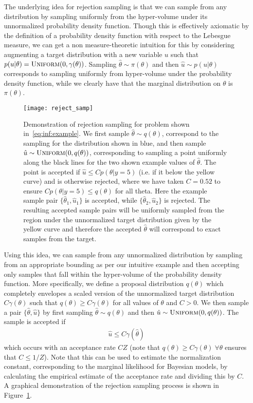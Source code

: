The underlying idea for rejection sampling is that we can sample from any distribution
by sampling uniformly from the hyper-volume under its unnormalized probability density function.
Though this is effectively axiomatic by the definition of a probability density
function with respect to the Lebesgue measure, we can get a non measure-theoretic
intuition for this by considering augmenting a target distribution with a new variable $u$
such that $p(u|\theta) = \textsc{Uniform}(0,\gamma(\theta))$.  Sampling 
$\hat{\theta} \sim \pi(\theta)$ and then $\hat{u}\sim p(u|\theta)$ corresponds to
sampling uniformly from hyper-volume under the probability density function, while we
clearly have that the marginal distribution on $\theta$ is $\pi(\theta)$.

\begin{figure}[t]
	\centering
	\texttt{[image: reject\_samp]}
	\caption{Demonstration of rejection sampling for problem shown in~\eqref{eq:inf:example}.  
		We first sample $\hat{\theta}\sim q(\theta)$, correspond to the sampling for the distribution
		shown in blue,
		and then sample $\hat{u}\sim \textsc{Uniform}(0,q(\theta))$, corresponding to
		sampling a point uniformly along the black lines for the two shown example values of 
		$\hat{\theta}$.  The point is accepted 
		if $\hat{u} \le C p(\theta | y=5)$ (i.e. if it below the yellow curve) and is 
		otherwise rejected, where we have taken
		$C=0.52$ to ensure $C p(\theta | y=5)\le q(\theta)$ for all theta.
		Here the example sample pair $\{\hat{\theta}_1,\hat{u}_1\}$ is accepted, while
		$\{\hat{\theta}_2,\hat{u}_2\}$ is rejected.  The
		resulting accepted sample pairs will be uniformly sampled from the region under
		the unnormalized target distribution given by the yellow curve and therefore
		the accepted $\hat{\theta}$ will correspond to exact samples from the target.
		 \label{fig:inf:rej-samp}}
\end{figure}

Using this idea, we can sample from any unnormalized distribution by sampling from
an appropriate bounding as per our intuitive example and then accepting only samples
that fall within the hyper-volume of the probability density function. 
More specifically, we define a proposal
distribution $q(\theta)$ which completely envelopes a
scaled version of the unnormalized target distribution $C\gamma(\theta)$ such that 
$q(\theta)\ge C \gamma(\theta)$ for all values of $\theta$ and $C>0$.  We then sample a pair 
$\{\hat{\theta},\hat{u}\}$ by first sampling $\hat{\theta} \sim q(\theta)$ and then
$\hat{u} \sim \textsc{Uniform}(0,q(\theta))$.  The sample is accepted if
\begin{align}
	\label{eq:inf:rej-acc-criteria}
	\hat{u} \le C \gamma(\hat{\theta})
\end{align}
which occurs with an acceptance rate $CZ$ (note that $q(\theta)\ge C \gamma(\theta) \; \forall \theta$
ensures that $C \le 1/Z$).  Note that this can be used to estimate the normalization
constant, corresponding to the marginal likelihood for Bayesian models, by calculating
the empirical estimate of the acceptance rate and dividing this by $C$.
A graphical demonstration of the rejection sampling process is shown in 
Figure~\ref{fig:inf:rej-samp}.

